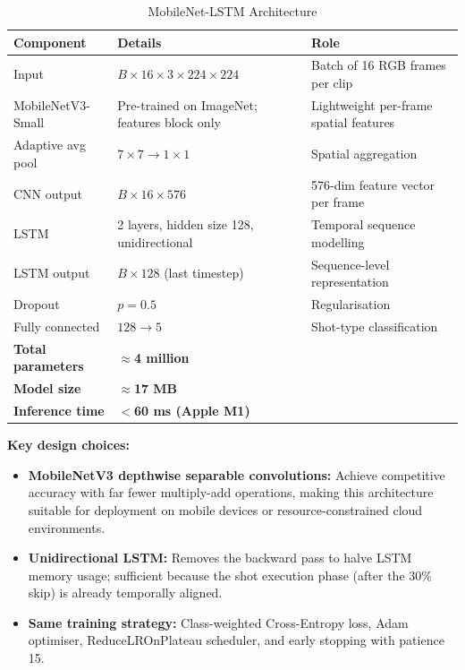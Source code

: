 \documentclass[11pt,a4paper]{article}
\begin{document}
\begin{table}[H]
\centering
\caption{MobileNet-LSTM Architecture}
\begin{tabular}{llp{6cm}}
\toprule
\textbf{Component} & \textbf{Details} & \textbf{Role} \\
\midrule
Input & $B \times 16 \times 3 \times 224 \times 224$ & Batch of 16 RGB frames per clip \\
MobileNetV3-Small & Pre-trained on ImageNet; features block only & Lightweight per-frame spatial features \\
Adaptive avg pool & $7\times 7 \to 1\times 1$ & Spatial aggregation \\
CNN output & $B \times 16 \times 576$ & 576-dim feature vector per frame \\
LSTM & 2 layers, hidden size 128, unidirectional & Temporal sequence modelling \\
LSTM output & $B \times 128$ (last timestep) & Sequence-level representation \\
Dropout & $p = 0.5$ & Regularisation \\
Fully connected & $128 \to 5$ & Shot-type classification \\
\midrule
\textbf{Total parameters} & \multicolumn{2}{l}{\textbf{$\approx$4 million}} \\
\textbf{Model size} & \multicolumn{2}{l}{\textbf{$\approx$17 MB}} \\
\textbf{Inference time} & \multicolumn{2}{l}{\textbf{$<$60 ms (Apple M1)}} \\
\bottomrule
\end{tabular}
\end{table}

\textbf{Key design choices:}
\begin{itemize}
  \item \textbf{MobileNetV3 depthwise separable convolutions:} Achieve competitive accuracy with far fewer multiply-add operations, making this architecture suitable for deployment on mobile devices or resource-constrained cloud environments.
  \item \textbf{Unidirectional LSTM:} Removes the backward pass to halve LSTM memory usage; sufficient because the shot execution phase (after the 30\% skip) is already temporally aligned.
  \item \textbf{Same training strategy:} Class-weighted Cross-Entropy loss, Adam optimiser, ReduceLROnPlateau scheduler, and early stopping with patience 15.
\end{itemize}
\end{document}
